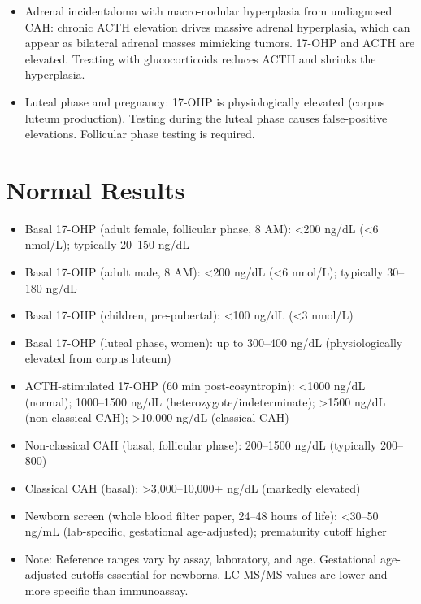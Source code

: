 \begin{itemize}
  \item Adrenal incidentaloma with macro-nodular hyperplasia from undiagnosed CAH: chronic ACTH elevation drives massive adrenal hyperplasia, which can appear as bilateral adrenal masses mimicking tumors. 17-OHP and ACTH are elevated. Treating with glucocorticoids reduces ACTH and shrinks the hyperplasia.
  \item Luteal phase and pregnancy: 17-OHP is physiologically elevated (corpus luteum production). Testing during the luteal phase causes false-positive elevations. Follicular phase testing is required.
\end{itemize}

\section*{Normal Results}
\begin{itemize}
  \item Basal 17-OHP (adult female, follicular phase, 8 AM): <200 ng/dL (<6 nmol/L); typically 20--150 ng/dL
  \item Basal 17-OHP (adult male, 8 AM): <200 ng/dL (<6 nmol/L); typically 30--180 ng/dL
  \item Basal 17-OHP (children, pre-pubertal): <100 ng/dL (<3 nmol/L)
  \item Basal 17-OHP (luteal phase, women): up to 300--400 ng/dL (physiologically elevated from corpus luteum)
  \item ACTH-stimulated 17-OHP (60 min post-cosyntropin): <1000 ng/dL (normal); 1000--1500 ng/dL (heterozygote/indeterminate); >1500 ng/dL (non-classical CAH); >10,000 ng/dL (classical CAH)
  \item Non-classical CAH (basal, follicular phase): 200--1500 ng/dL (typically 200--800)
  \item Classical CAH (basal): >3,000--10,000+ ng/dL (markedly elevated)
  \item Newborn screen (whole blood filter paper, 24--48 hours of life): <30--50 ng/mL (lab-specific, gestational age-adjusted); prematurity cutoff higher
  \item Note: Reference ranges vary by assay, laboratory, and age. Gestational age-adjusted cutoffs essential for newborns. LC-MS/MS values are lower and more specific than immunoassay.
\end{itemize}

